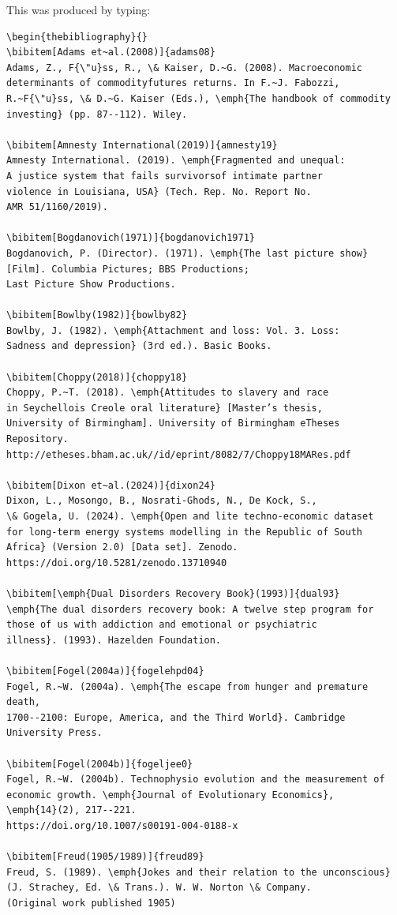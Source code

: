 \documentclass[]{interact}
\theoremstyle{plain}%
\theoremstyle{definition}
\theoremstyle{remark}
\begin{document}
\bigskip
\noindent This was produced by typing:
\begin{verbatim}
\begin{thebibliography}{}
\bibitem[Adams et~al.(2008)]{adams08}
Adams, Z., F{\"u}ss, R., \& Kaiser, D.~G. (2008). Macroeconomic 
determinants of commodityfutures returns. In F.~J. Fabozzi, 
R.~F{\"u}ss, \& D.~G. Kaiser (Eds.), \emph{The handbook of commodity
investing} (pp. 87--112). Wiley.

\bibitem[Amnesty International(2019)]{amnesty19}
Amnesty International. (2019). \emph{Fragmented and unequal:
A justice system that fails survivorsof intimate partner
violence in Louisiana, USA} (Tech. Rep. No. Report No.
AMR 51/1160/2019).

\bibitem[Bogdanovich(1971)]{bogdanovich1971}
Bogdanovich, P. (Director). (1971). \emph{The last picture show}
[Film]. Columbia Pictures; BBS Productions; 
Last Picture Show Productions.

\bibitem[Bowlby(1982)]{bowlby82}
Bowlby, J. (1982). \emph{Attachment and loss: Vol. 3. Loss:
Sadness and depression} (3rd ed.). Basic Books.

\bibitem[Choppy(2018)]{choppy18}
Choppy, P.~T. (2018). \emph{Attitudes to slavery and race
in Seychellois Creole oral literature} [Master’s thesis,
University of Birmingham]. University of Birmingham eTheses Repository.
http://etheses.bham.ac.uk//id/eprint/8082/7/Choppy18MARes.pdf

\bibitem[Dixon et~al.(2024)]{dixon24}
Dixon, L., Mosongo, B., Nosrati-Ghods, N., De Kock, S.,
\& Gogela, U. (2024). \emph{Open and lite techno-economic dataset
for long-term energy systems modelling in the Republic of South
Africa} (Version 2.0) [Data set]. Zenodo.
https://doi.org/10.5281/zenodo.13710940

\bibitem[\emph{Dual Disorders Recovery Book}(1993)]{dual93}
\emph{The dual disorders recovery book: A twelve step program for
those of us with addiction and emotional or psychiatric
illness}. (1993). Hazelden Foundation.

\bibitem[Fogel(2004a)]{fogelehpd04}
Fogel, R.~W. (2004a). \emph{The escape from hunger and premature death,
1700--2100: Europe, America, and the Third World}. Cambridge
University Press.

\bibitem[Fogel(2004b)]{fogeljee0}
Fogel, R.~W. (2004b). Technophysio evolution and the measurement of
economic growth. \emph{Journal of Evolutionary Economics},
\emph{14}(2), 217--221.
https://doi.org/10.1007/s00191-004-0188-x

\bibitem[Freud(1905/1989)]{freud89}
Freud, S. (1989). \emph{Jokes and their relation to the unconscious}
(J. Strachey, Ed. \& Trans.). W. W. Norton \& Company.
(Original work published 1905)


\end{verbatim}
\end{document}
